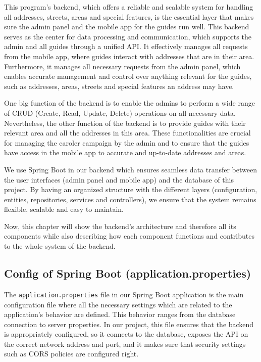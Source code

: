 \Author{\daAuthorThree}

    This program's backend, which offers a reliable and scalable system for handling all addresses, streets, areas and special features, is the essential layer that makes sure the admin panel and the mobile app for the guides run well. \newline
    This backend serves as the center for data processing and communication, which supports the admin and all guides through a unified API. \newline
    It effectively manages all requests from the mobile app, where guides interact with addresses that are in their area. Furthermore, it manages all necessary requests from the admin panel, which enables accurate management and control over anything relevant for the guides, such as addresses, areas, streets and special features an address may have. \newline 

    One big function of the backend is to enable the admins to perform a wide range of CRUD (Create, Read, Update, Delete) operations on all necessary data. Nevertheless, the other function of the backend is to provide guides with their relevant area and all the addresses in this area. These functionalities are crucial for managing the caroler campaign by the admin and to ensure that the guides have access in the mobile app to accurate and up-to-date addresses and areas. \newline

    We use Spring Boot in our backend which ensures seamless data transfer between the user interfaces (admin panel and mobile app) and the database of this project. By having an organized structure with the different layers (configuration, entities, repositories, services and controllers), we ensure that the system remains flexible, scalable and easy to maintain. \newline 

    Now, this chapter will show the backend's architecture and therefore all its components while also describing how each component functions and contributes to the whole system of the backend.

    \subsection{Config of Spring Boot (application.properties)}
    The \texttt{application.properties} file in our Spring Boot application is the main configuration file where all the necessary settings which are related to the application's behavior are defined. This behavior ranges from the database connection to server properties. In our project, this file ensures that the backend is appropriately configured, so it connects to the database, exposes the API on the correct network address and port, and it makes sure that security settings such as CORS policies are configured right.

